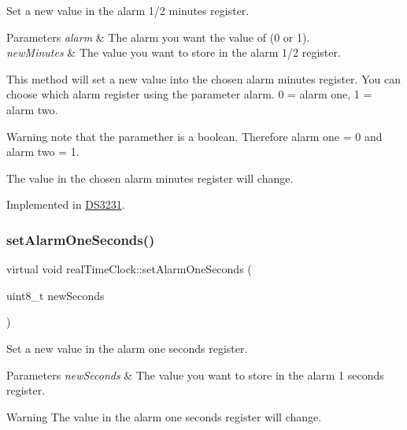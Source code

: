 Set a new value in the alarm 1/2 minutes register. 


\begin{DoxyParams}{Parameters}
{\em alarm} & The alarm you want the value of (0 or 1). \\
\hline
{\em new\+Minutes} & The value you want to store in the alarm 1/2 register.\\
\hline
\end{DoxyParams}
This method will set a new value into the chosen alarm minutes register. You can choose which alarm register using the parameter alarm. 0 = alarm one, 1 = alarm two. \begin{DoxyWarning}{Warning}
note that the paramether is a boolean. Therefore alarm one = 0 and alarm two = 1. 

The value in the chosen alarm minutes register will change. 
\end{DoxyWarning}


Implemented in \mbox{\hyperlink{class_d_s3231_a9c1f5b183c24f3062c1c8c299f46023c}{D\+S3231}}.

\mbox{\label{classreal_time_clock_a448cbe8ab7f6649ee32eeb415721707f}} 
\subsubsection{\texorpdfstring{set\+Alarm\+One\+Seconds()}{setAlarmOneSeconds()}}
{\footnotesize\ttfamily virtual void real\+Time\+Clock\+::set\+Alarm\+One\+Seconds (\begin{DoxyParamCaption}\item[{uint8\+\_\+t}]{new\+Seconds }\end{DoxyParamCaption})\hspace{0.3cm}{\ttfamily [pure virtual]}}



Set a new value in the alarm one seconds register. 


\begin{DoxyParams}{Parameters}
{\em new\+Seconds} & The value you want to store in the alarm 1 seconds register. \\
\hline
\end{DoxyParams}
\begin{DoxyWarning}{Warning}
The value in the alarm one seconds register will change. 
\end{DoxyWarning}


